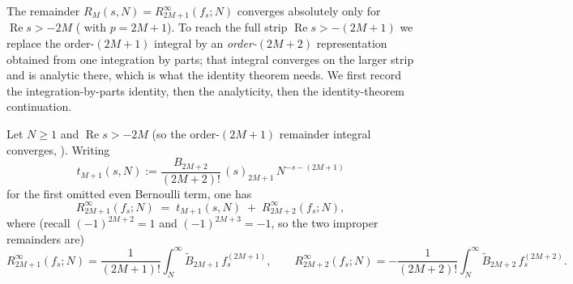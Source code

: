 The remainder $R_M(s,N) = R^{\infty}_{2M+1}(f_s; N)$ converges absolutely only for
$\operatorname{Re} s > -2M$ ( with $p = 2M+1$). To reach the
full strip $\operatorname{Re} s > -(2M+1)$ we replace the order-$(2M+1)$ integral by an
\emph{order-$(2M+2)$} representation obtained from one integration by parts; that integral
converges on the larger strip and is analytic there, which is what the identity theorem
needs. We first record the integration-by-parts identity, then the analyticity, then the
identity-theorem continuation.

\begin{lemma}
\label{lem:rem_ibp}
\leanok
{}
Let $N \ge 1$ and $\operatorname{Re} s > -2M$ (so the order-$(2M+1)$ remainder integral
converges, ). Writing
\[
  t_{M+1}(s,N) := \frac{B_{2M+2}}{(2M+2)!}\,(s)_{2M+1}\,N^{-s-(2M+1)}
\]
for the first omitted even Bernoulli term, one has
\[
  R^{\infty}_{2M+1}(f_s; N) \;=\; t_{M+1}(s,N) \;+\; R^{\infty}_{2M+2}(f_s; N),
\]
where (recall $(-1)^{2M+2}=1$ and $(-1)^{2M+3}=-1$, so the two improper remainders are)
\[
  R^{\infty}_{2M+1}(f_s; N) = \frac{1}{(2M+1)!}\int_N^{\infty}\widetilde{B}_{2M+1}\,f_s^{(2M+1)},
  \qquad
  R^{\infty}_{2M+2}(f_s; N) = -\frac{1}{(2M+2)!}\int_N^{\infty}\widetilde{B}_{2M+2}\,f_s^{(2M+2)} .
\]
\end{lemma}

